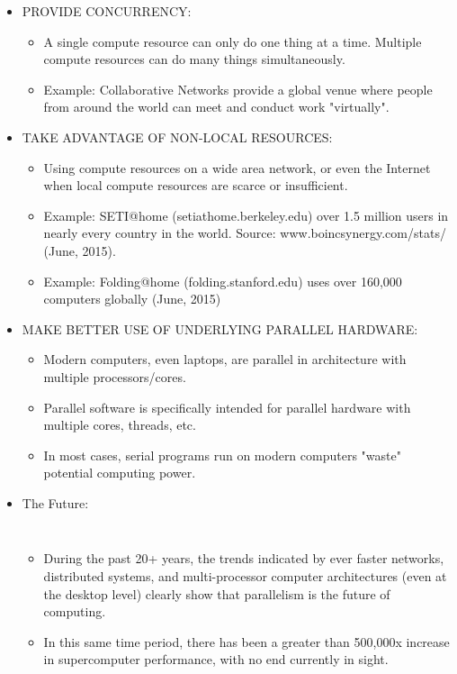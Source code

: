 \documentclass[10pt,t]{beamer}
\begin{document}
\begin{frame}[allowframebreaks,c]
\begin{itemize}
\begin{itemize}
    \end{itemize}
  \item PROVIDE CONCURRENCY:
    \begin{itemize}
    \item A single compute resource can only do one thing at a time. Multiple compute resources can do many things simultaneously.
    \item Example: Collaborative Networks provide a global venue where people from around the world can meet and conduct work "virtually".
    \end{itemize}
    \framebreak
  \item TAKE ADVANTAGE OF NON-LOCAL RESOURCES:
    \begin{itemize}
    \item Using compute resources on a wide area network, or even the Internet when local compute resources are scarce or insufficient.
    \item Example: SETI@home (setiathome.berkeley.edu) over 1.5 million users in nearly every country in the world. Source: www.boincsynergy.com/stats/ (June, 2015).
    \item Example: Folding@home (folding.stanford.edu) uses over 160,000 computers globally (June, 2015)
    \end{itemize}
  \item MAKE BETTER USE OF UNDERLYING PARALLEL HARDWARE:
    \begin{itemize}
    \item Modern computers, even laptops, are parallel in architecture with multiple processors/cores.
    \item Parallel software is specifically intended for parallel hardware with multiple cores, threads, etc.
    \item In most cases, serial programs run on modern computers "waste" potential computing power.
    \end{itemize}
    \framebreak
  \item The Future:
    \begin{columns}[c]
      \begin{itemize}
      \item During the past 20+ years, the trends indicated by ever faster networks, distributed systems, and multi-processor computer architectures (even at the desktop level) clearly show that parallelism is the future of computing.
      \item In this same time period, there has been a greater than 500,000x increase in supercomputer performance, with no end currently in sight.

\end{itemize}
\end{columns}
\end{itemize}
\end{frame}
\end{document}
